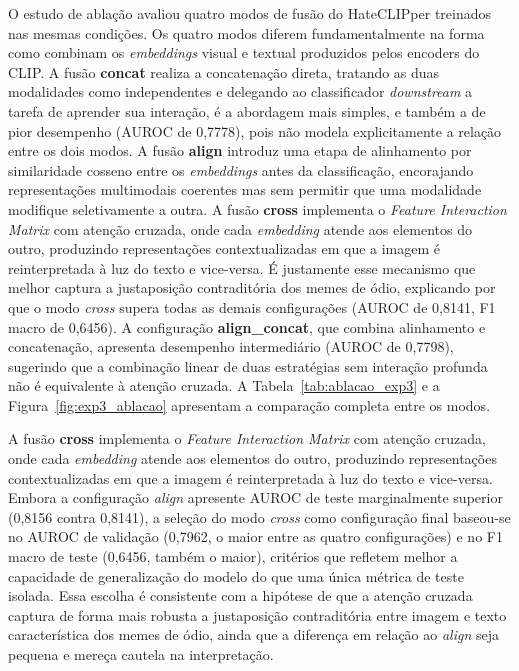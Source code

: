 O estudo de ablação avaliou quatro modos de fusão do HateCLIPper treinados nas mesmas condições. Os quatro modos diferem fundamentalmente na forma como combinam os \textit{embeddings} visual e textual produzidos pelos encoders do CLIP. A fusão \textbf{concat} realiza a concatenação direta, tratando as duas modalidades como independentes e delegando ao classificador \textit{downstream} a tarefa de aprender sua interação, é a abordagem mais simples, e também a de pior desempenho (AUROC de 0,7778), pois não modela explicitamente a relação entre os dois modos. A fusão \textbf{align} introduz uma etapa de alinhamento por similaridade cosseno entre os \textit{embeddings} antes da classificação, encorajando representações multimodais coerentes mas sem permitir que uma modalidade modifique seletivamente a outra. A fusão \textbf{cross} implementa o \textit{Feature Interaction Matrix} com atenção cruzada, onde cada \textit{embedding} atende aos elementos do outro, produzindo representações contextualizadas em que a imagem é reinterpretada à luz do texto e vice-versa. É justamente esse mecanismo que melhor captura a justaposição contraditória dos memes de ódio, explicando por que o modo \textit{cross} supera todas as demais configurações (AUROC de 0,8141, F1 macro de 0,6456). A configuração \textbf{align\_concat}, que combina alinhamento e concatenação, apresenta desempenho intermediário (AUROC de 0,7798), sugerindo que a combinação linear de duas estratégias sem interação profunda não é equivalente à atenção cruzada. A Tabela~\ref{tab:ablacao_exp3} e a Figura~\ref{fig:exp3_ablacao} apresentam a comparação completa entre os modos.

A fusão \textbf{cross} implementa o \textit{Feature Interaction Matrix} com atenção cruzada, onde cada \textit{embedding} atende aos elementos do outro, produzindo representações contextualizadas em que a imagem é reinterpretada à luz do texto e vice-versa. Embora a configuração \textit{align} apresente AUROC de teste marginalmente superior (0,8156 contra 0,8141), a seleção do modo \textit{cross} como configuração final baseou-se no AUROC de validação (0,7962, o maior entre as quatro configurações) e no F1 macro de teste (0,6456, também o maior), critérios que refletem melhor a capacidade de generalização do modelo do que uma única métrica de teste isolada. Essa escolha é consistente com a hipótese de que a atenção cruzada captura de forma mais robusta a justaposição contraditória entre imagem e texto característica dos memes de ódio, ainda que a diferença em relação ao \textit{align} seja pequena e mereça cautela na interpretação.

